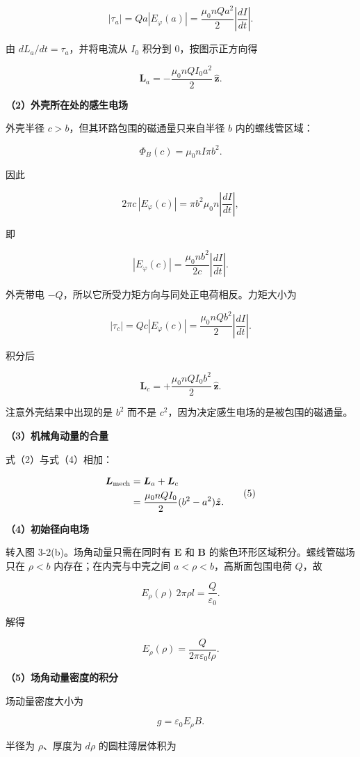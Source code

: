 \documentclass[12pt,a4paper,UTF8]{ctexart}
\begin{document}
\[
|\tau_a|=Qa|E_\varphi(a)|
=\frac{\mu_0nQa^2}{2}
\left|\frac{dI}{dt}\right|.
\]

由 \(dL_a/dt=\tau_a\)，并将电流从 \(I_0\) 积分到 \(0\)，按图示正方向得

\[
\boxed{
\bm L_a=-\frac{\mu_0nQI_0a^2}{2}\,\hat{\bm z}
}.\tag{2}
\]

\textbf{（2）外壳所在处的感生电场}

外壳半径 \(c>b\)，但其环路包围的磁通量只来自半径 \(b\) 内的螺线管区域：

\[
\Phi_B(c)=\mu_0nI\pi b^2.
\]

因此

\[
2\pi c\,|E_\varphi(c)|
=\pi b^2\mu_0n\left|\frac{dI}{dt}\right|,
\]

即

\[
|E_\varphi(c)|
=\frac{\mu_0nb^2}{2c}
\left|\frac{dI}{dt}\right|.\tag{3}
\]

外壳带电 \(-Q\)，所以它所受力矩方向与同处正电荷相反。力矩大小为

\[
|\tau_c|
=Qc|E_\varphi(c)|
=\frac{\mu_0nQb^2}{2}
\left|\frac{dI}{dt}\right|.
\]

积分后

\[
\boxed{
\bm L_c=+\frac{\mu_0nQI_0b^2}{2}\,\hat{\bm z}
}.\tag{4}
\]

注意外壳结果中出现的是 \(b^2\) 而不是
\(c^2\)，因为决定感生电场的是被包围的磁通量。

\textbf{（3）机械角动量的合量}

式（2）与式（4）相加：

\[
\begin{aligned}
\bm L_{\rm mech}
&=\bm L_a+\bm L_c\\
&=\frac{\mu_0nQI_0}{2}(b^2-a^2)\hat{\bm z}.
\end{aligned}\tag{5}
\]

\textbf{（4）初始径向电场}

转入图 3-2(b)。场角动量只需在同时有 \(\bm E\) 和 \(\bm B\)
的紫色环形区域积分。螺线管磁场只在 \(\rho<b\) 内存在；在内壳与中壳之间
\(a<\rho<b\)，高斯面包围电荷 \(Q\)，故

\[
E_\rho(\rho)\,2\pi\rho l=\frac{Q}{\varepsilon_0}.
\]

解得

\[
E_\rho(\rho)=\frac{Q}{2\pi\varepsilon_0l\rho}.\tag{6}
\]

\textbf{（5）场角动量密度的积分}

场动量密度大小为

\[
g=\varepsilon_0E_\rho B.
\]

半径为 \(\rho\)、厚度为 \(d\rho\) 的圆柱薄层体积为
\end{document}
